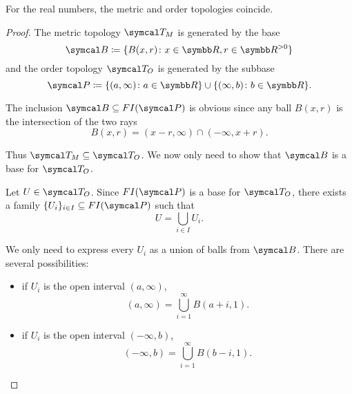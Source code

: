 \begin{theorem}\label{thm:real_metric_and_order_topologies_coincide}
  For the real numbers, the metric and order topologies coincide.
\end{theorem}
\begin{proof}
  The metric topology \( \Cal{T}_M \) is generated by the base
  \begin{equation*}
    \Cal{B} \coloneqq \{ B(x, r) \colon x \in \BB{R}, r \in \BB{R}^{>0} \}
  \end{equation*}
  and the order topology \( \Cal{T}_O \) is generated by the subbase
  \begin{equation*}
    \Cal{P} \coloneqq \{ (a, \infty) \colon a \in \BB{R} \} \cup \{ (\infty, b) \colon b \in \BB{R} \}.
  \end{equation*}

  The inclusion \( \Cal{B} \subseteq FI(\Cal{P}) \) is obvious since any ball \( B(x, r) \) is the intersection of the two rays
  \begin{equation*}
    B(x, r) = (x - r, \infty) \cap (-\infty, x + r).
  \end{equation*}

  Thus \( \Cal{T}_M \subseteq \Cal{T}_O \). We now only need to show that \( \Cal{B} \) is a base for \( \Cal{T}_O \).

  Let \( U \in \Cal{T}_O \). Since \( FI(\Cal{P}) \) is a base for \( \Cal{T}_O \), there exists a family \( \{ U_i \}_{i \in I} \subseteq FI(\Cal{P}) \) such that
  \begin{equation*}
    U = \bigcup_{i \in I} U_i.
  \end{equation*}

  We only need to express every \( U_i \) as a union of balls from \( \Cal{B} \). There are several possibilities:
  \begin{itemize}
    \item if \( U_i \) is the open interval \( (a, \infty) \),
    \begin{equation*}
      (a, \infty) = \bigcup_{i=1}^\infty B(a + i, 1).
    \end{equation*}

    \item if \( U_i \) is the open interval \( (-\infty, b) \),
    \begin{equation*}
      (-\infty, b) = \bigcup_{i=1}^\infty B(b - i, 1).
    \end{equation*}


\end{itemize}
\end{proof}
